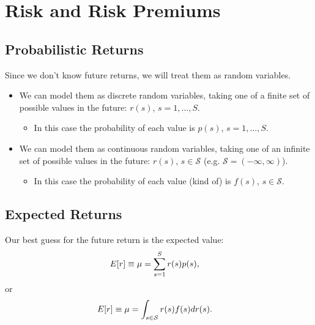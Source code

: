 \documentclass[letterpaper,10pt,english]{sphinxmanual}
\begin{document}
\section{Risk and Risk Premiums}
\label{risk:risk-and-risk-premiums}\label{risk::doc}

\subsection{Probabilistic Returns}
\label{risk:probabilistic-returns}
Since we don't know future returns, we will treat them as random
variables.
\begin{itemize}
\item {} 
We can model them as discrete random variables, taking one of a
finite set of possible values in the future: $r(s)$, $s
= 1, \ldots, S$.
\begin{itemize}
\item {} 
In this case the probability of each value is $p(s)$,
$s=1,\ldots,S$.

\end{itemize}

\end{itemize}
\begin{itemize}
\item {} 
We can model them as continuous random variables, taking one of an
infinite set of possible values in the future: $r(s)$,
$s \in \mathcal{S}$ (e.g. $\mathcal{S} = (-\infty, \infty)$).
\begin{itemize}
\item {} 
In this case the probability of each value (kind of) is
$f(s)$, $s \in \mathcal{S}$.

\end{itemize}

\end{itemize}


\subsection{Expected Returns}
\label{risk:expected-returns}
Our best guess for the future return is the expected value:
\begin{gather}
\begin{split}E[r] & \equiv \mu = \sum_{s=1}^S r(s) p(s),\end{split}\notag
\end{gather}
or
\begin{gather}
\begin{split}E[r] & \equiv \mu = \int_{s \in \mathcal{S}} r(s) f(s) dr(s).\end{split}\notag
\end{gather}
\end{document}
